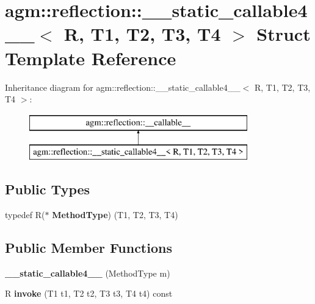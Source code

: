 \hypertarget{structagm_1_1reflection_1_1____static__callable4____}{}\section{agm\+:\+:reflection\+:\+:\+\_\+\+\_\+static\+\_\+callable4\+\_\+\+\_\+$<$ R, T1, T2, T3, T4 $>$ Struct Template Reference}
\label{structagm_1_1reflection_1_1____static__callable4____}
Inheritance diagram for agm\+:\+:reflection\+:\+:\+\_\+\+\_\+static\+\_\+callable4\+\_\+\+\_\+$<$ R, T1, T2, T3, T4 $>$\+:\begin{figure}[H]
\begin{center}
\leavevmode
\includegraphics[height=2.000000cm]{structagm_1_1reflection_1_1____static__callable4____}
\end{center}
\end{figure}
\subsection*{Public Types}
\begin{DoxyCompactItemize}
\item 
typedef R($\ast$ {\bfseries Method\+Type}) (T1, T2, T3, T4)\hypertarget{structagm_1_1reflection_1_1____static__callable4_____a05ffa56655ec154e595f597e7b3c67bb}{}\label{structagm_1_1reflection_1_1____static__callable4_____a05ffa56655ec154e595f597e7b3c67bb}

\end{DoxyCompactItemize}
\subsection*{Public Member Functions}
\begin{DoxyCompactItemize}
\item 
{\bfseries \+\_\+\+\_\+static\+\_\+callable4\+\_\+\+\_\+} (Method\+Type m)\hypertarget{structagm_1_1reflection_1_1____static__callable4_____aa0b507aadf0cf83fc80030599ddb6e89}{}\label{structagm_1_1reflection_1_1____static__callable4_____aa0b507aadf0cf83fc80030599ddb6e89}

\item 
R {\bfseries invoke} (T1 t1, T2 t2, T3 t3, T4 t4) const \hypertarget{structagm_1_1reflection_1_1____static__callable4_____a9f70bf7a1dc345aaad910a2a09c339a9}{}\label{structagm_1_1reflection_1_1____static__callable4_____a9f70bf7a1dc345aaad910a2a09c339a9}

\end{DoxyCompactItemize}
